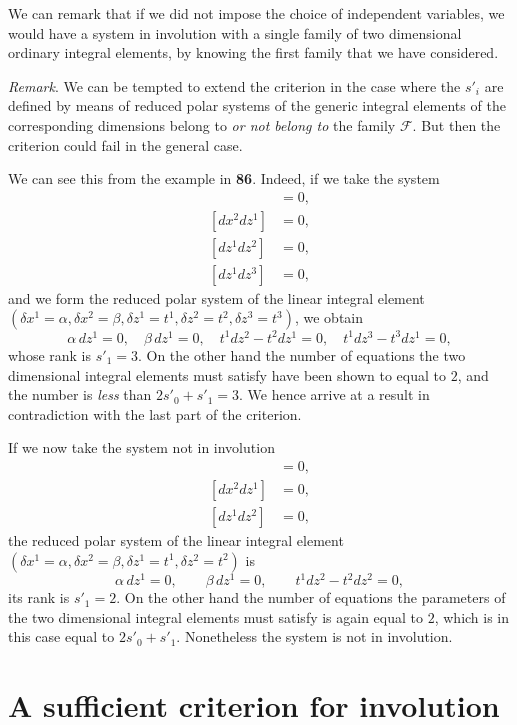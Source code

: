 We can remark that if we did not impose the choice of independent variables, we would have a system in involution with a single family of two dimensional ordinary integral elements, by knowing the first family that we have considered.


\vspace{12pt}\fsec \emph{Remark}. We can be tempted to extend the criterion in the case where the $s'_{i}$ are defined by means of reduced polar systems of the generic integral elements of the corresponding dimensions belong to \emph{or not belong to} the family $\mathcal{F}$. But then the criterion could fail in the general case.

We can see this from the example in \textsection\textbf{86}. Indeed, if we take the system
\begin{align*}
  [dx^{1}dz^{1}]&=0,\\
  [dx^{2}dz^{1}]&=0,\\
  [dz^{1}dz^{2}]&=0,\\
  [dz^{1}dz^{3}]&=0,
\end{align*}
and we form the reduced polar system of the linear integral element $(\delta x^{1}=\alpha,\delta x^{2}=\beta,\delta z^{1}=t^{1},\delta z^{2}=t^{2},\delta z^{3}=t^{3})$, we obtain
\[
\alpha\,dz^{1}=0,\quad \beta\,dz^{1}=0,\quad t^{1}dz^{2}-t^{2}dz^{1}=0,\quad t^{1}dz^{3}-t^{3}dz^{1}=0,
\]
whose rank is $s'_{1}=3$. On the other hand the number of equations the two dimensional integral elements must satisfy have been shown to equal to $2$, and the number is \emph{less} than $2s'_{0}+s'_{1}=3$. We hence arrive at a result in contradiction with the last part of the criterion.

If we now take the system not in involution
\begin{align*}
  [dx^{1}dz^{1}]&=0,\\
  [dx^{2}dz^{1}]&=0,\\
  [dz^{1}dz^{2}]&=0,  
\end{align*}
the reduced polar system of the linear integral element $(\delta x^{1}=\alpha,\delta x^{2}=\beta,\delta z^{1}=t^{1},\delta z^{2}=t^{2})$ is
\[
\alpha\, dz^{1}=0,\qquad \beta\, dz^{1}=0,\qquad t^{1}dz^{2}-t^{2}dz^{2}=0,
\]
its rank is $s'_{1}=2$. On the other hand the number of equations the parameters of the two dimensional integral elements must satisfy is again equal to $2$, which is in this case equal to $2s'_{0}+s'_{1}$. Nonetheless the system is not in involution.


\section{A sufficient criterion for involution}
\label{sec:suff-crit-invol}

